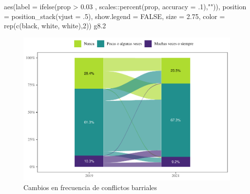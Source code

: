 \documentclass[
  12pt,
]{book}
\newenvironment{Shaded}{\begin{snugshade}}{\end{snugshade}}
\newcommand{\AttributeTok}[1]{\textcolor[rgb]{0.77,0.63,0.00}{#1}}
\newcommand{\ConstantTok}[1]{\textcolor[rgb]{0.00,0.00,0.00}{#1}}
\newcommand{\DecValTok}[1]{\textcolor[rgb]{0.00,0.00,0.81}{#1}}
\newcommand{\FloatTok}[1]{\textcolor[rgb]{0.00,0.00,0.81}{#1}}
\newcommand{\FunctionTok}[1]{\textcolor[rgb]{0.00,0.00,0.00}{#1}}
\newcommand{\NormalTok}[1]{#1}
\newcommand{\SpecialCharTok}[1]{\textcolor[rgb]{0.00,0.00,0.00}{#1}}
\newcommand{\StringTok}[1]{\textcolor[rgb]{0.31,0.60,0.02}{#1}}
\begin{document}
\begin{Shaded}
\begin{Highlighting}[]
            \FunctionTok{aes}\NormalTok{(}\AttributeTok{label =} \FunctionTok{ifelse}\NormalTok{(prop }\SpecialCharTok{\textgreater{}} \FloatTok{0.03}\NormalTok{ , scales}\SpecialCharTok{::}\FunctionTok{percent}\NormalTok{(prop, }\AttributeTok{accuracy =}\NormalTok{ .}\DecValTok{1}\NormalTok{),}\StringTok{""}\NormalTok{)),}
            \AttributeTok{position =} \FunctionTok{position\_stack}\NormalTok{(}\AttributeTok{vjust =}\NormalTok{ .}\DecValTok{5}\NormalTok{),}
            \AttributeTok{show.legend =} \ConstantTok{FALSE}\NormalTok{,}
            \AttributeTok{size =} \FloatTok{2.75}\NormalTok{,}
            \AttributeTok{color =} \FunctionTok{rep}\NormalTok{(}\FunctionTok{c}\NormalTok{(}\StringTok{\textquotesingle{}black\textquotesingle{}}\NormalTok{, }\StringTok{\textquotesingle{}white\textquotesingle{}}\NormalTok{, }\StringTok{\textquotesingle{}white\textquotesingle{}}\NormalTok{),}\DecValTok{2}\NormalTok{))}
\NormalTok{g8}\FloatTok{.2}
\end{Highlighting}
\end{Shaded}

\begin{figure}

{\centering \includegraphics{reporte-elsoc_files/figure-latex/confli-cambio-1} 

}

\caption{Cambios en frecuencia de conflictos barriales}\label{fig:confli-cambio}
\end{figure}
\end{document}
